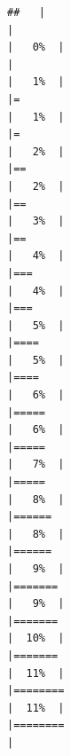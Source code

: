\documentclass[
  english,
  man,a4paper,mask,floatsintext]{apa6}
\begin{document}
\begin{verbatim}
##   |                                                                              |                                                                      |   0%  |                                                                              |                                                                      |   1%  |                                                                              |=                                                                     |   1%  |                                                                              |=                                                                     |   2%  |                                                                              |==                                                                    |   2%  |                                                                              |==                                                                    |   3%  |                                                                              |==                                                                    |   4%  |                                                                              |===                                                                   |   4%  |                                                                              |===                                                                   |   5%  |                                                                              |====                                                                  |   5%  |                                                                              |====                                                                  |   6%  |                                                                              |=====                                                                 |   6%  |                                                                              |=====                                                                 |   7%  |                                                                              |=====                                                                 |   8%  |                                                                              |======                                                                |   8%  |                                                                              |======                                                                |   9%  |                                                                              |=======                                                               |   9%  |                                                                              |=======                                                               |  10%  |                                                                              |=======                                                               |  11%  |                                                                              |========                                                              |  11%  |                                                                              |========                                                              |  
\end{verbatim}
\end{document}
